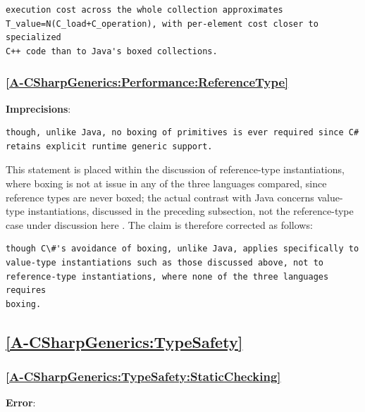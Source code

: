 \documentclass[11pt]{report}
\begin{document}
\begin{Verbatim}[breaklines=true]
execution cost across the whole collection approximates
T_value=N(C_load+C_operation), with per-element cost closer to specialized
C++ code than to Java's boxed collections.
\end{Verbatim}

\subsubsection*{\hyperref[A-CSharpGenerics:Performance:ReferenceType]{\ref*{A-CSharpGenerics:Performance:ReferenceType} }}

\noindent\textbf{Imprecisions}:

\begin{Verbatim}[breaklines=true]
though, unlike Java, no boxing of primitives is ever required since C#
retains explicit runtime generic support.
\end{Verbatim}

This statement is placed within the discussion of reference-type
instantiations, where boxing is not at issue in any of the three languages
compared, since reference types are never boxed; the actual contrast with
Java concerns value-type instantiations, discussed in the preceding
subsection, not the reference-type case under discussion here
\cite{kennedy2001}. The claim is therefore corrected as follows:

\begin{Verbatim}[breaklines=true]
though C\#'s avoidance of boxing, unlike Java, applies specifically to
value-type instantiations such as those discussed above, not to
reference-type instantiations, where none of the three languages requires
boxing.
\end{Verbatim}

\subsection*{\hyperref[A-CSharpGenerics:TypeSafety]{\ref*{A-CSharpGenerics:TypeSafety} }}

\subsubsection*{\hyperref[A-CSharpGenerics:TypeSafety:StaticChecking]{\ref*{A-CSharpGenerics:TypeSafety:StaticChecking} }}
\noindent\textbf{Error}:
\end{document}
